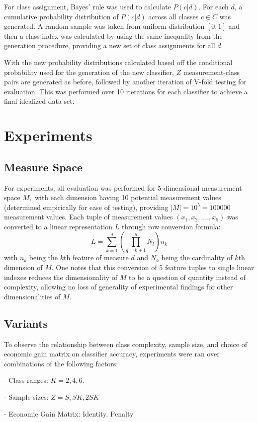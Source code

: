 \documentclass[10pt, conference]{IEEEtran}
\begin{document}
For class assignment, Bayes$'$ rule was used to calculate $P(c|d)$. For each $d$, a cumulative probability distribution of $P(c|d)$ across all classes $c\in C$ was generated. A random sample was taken from uniform distribution $[0,1]$ and then a class index was calculated by using the same inequality from the generation procedure, providing a new set of class assignments for all $d$. 

With the new probability distributions calculated based off the conditional probability used for the generation of the new classifier, $Z$ measurement-class pairs are generated as before, followed by another iteration of V-fold testing for evaluation. This was performed over 10 iterations for each classifier to achieve a final idealized data set.
\section{Experiments}
\subsection{Measure Space}
For experiments, all evaluation was performed for 5-dimensional measurement space $M,$ with each dimension having 10 potential measurement values (determined empirically for ease of testing), providing  $|M| = 10^5=100000$ measurement values. Each tuple of measurement values $(x_1,x_2,....,x_5)$ was converted to a linear representation $L$ through row conversion formula:
\begin{equation}
L = \sum_{k=1}^d (\prod_{q=k+ 1}^5 N_l ) n_k
\end{equation}
with $n_k$ being the $k$th feature of measure $d$ and $N_k$ being the cardinality of $k$th dimension of $M$. One notes that this conversion of 5 feature tuples to single linear indexes reduces the dimensionality of $M$ to be a question of quantity instead of complexity, allowing no loss of generality of experimental findings for other dimensionalities of $M$.
\subsection{Variants}
To observe the relationship between class complexity, sample size, and choice of economic gain matrix on classifier accuracy, experiments were ran over combinations of the following factors:

- Class ranges: $K = 2,4,6.$

- Sample sizes: $Z= S, SK, 2SK$ 

- Economic Gain Matrix: Identity, Penalty
\end{document}
